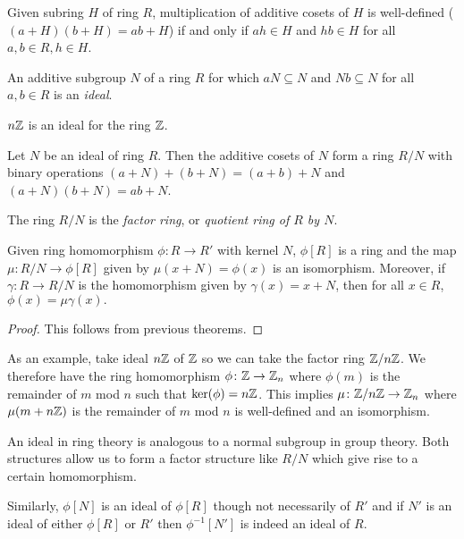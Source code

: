 \begin{theorem}
    Given subring $H$ of ring $R$, multiplication of additive cosets of $H$ is well-defined ($(a+H)(b+H)=ab+H$) if and only if $ah \in H$ and $hb \in H$ for all $a,b \in R, h \in H$.
\end{theorem}
\begin{definition}[Ideal]
    An additive subgroup $N$ of a ring $R$ for which $aN \subseteq N$ and $Nb \subseteq N$ for all $a,b \in R$ is an \emph{ideal}.
\end{definition}
\begin{example}
    $n\mathbb{Z}$ is an ideal for the ring $\mathbb{Z}$.
\end{example}
\begin{corollary}
    Let $N$ be an ideal of ring $R$. Then the additive cosets of $N$ form a ring $R/N$ with binary operations $(a+N) + (b+N) = (a+b) + N$ and $(a+N)(b+N) = ab+N$.
\end{corollary}
\begin{definition}
    The ring $R/N$ is the \emph{factor ring}, or \emph{quotient ring of $R$ by $N$}.
\end{definition}
\begin{theorem}
    Given ring homomorphism $\phi\colon R\to R'$ with kernel $N$, $\phi[R]$ is a ring and the map $\mu\colon R/N \to \phi[R]$ given by $\mu(x+N) = \phi(x)$ is an isomorphism. Moreover, if $\gamma\colon R\to R/N$ is the homomorphism given by $\gamma(x) = x+N$, then for all $x \in R$, $\phi(x) = \mu\gamma(x).$
\end{theorem}
\begin{proof}
    This follows from previous theorems.
\end{proof}
\begin{example}
    As an example, take ideal $n\mathbb{Z}$ of $\mathbb{Z}$ so we can take the factor ring $\mathbb{Z}/n\mathbb{Z}$. We therefore have the ring homomorphism $\phi\colon\mathbb{Z}\to\mathbb{Z}_n$ where $\phi(m)$ is the remainder of $m$ mod $n$ such that $\ker(\phi) = n\mathbb{Z}$. This implies $\mu\colon\mathbb{Z}/n\mathbb{Z}\to\mathbb{Z}_n$ where $\mu(m+n\mathbb{Z})$ is the remainder of $m$ mod $n$ is well-defined and an isomorphism.
\end{example}
\begin{remark}
    An ideal in ring theory is analogous to a normal subgroup in group theory. Both structures allow us to form a factor structure like $R/N$ which give rise to a certain homomorphism.

    Similarly, $\phi[N]$ is an ideal of $\phi[R]$ though not necessarily of $R'$ and if $N'$ is an ideal of either $\phi[R]$ or $R'$ then $\phi^{-1}[N']$ is indeed an ideal of $R$.
\end{remark}

